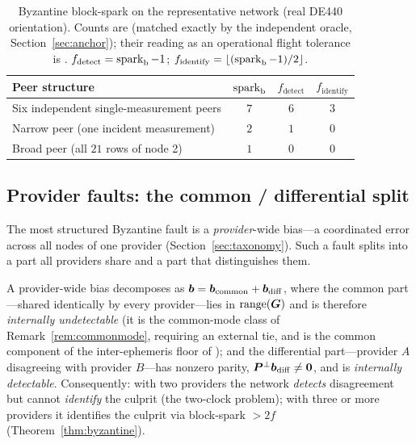 \begin{table}[t]
\centering
\caption{Byzantine block-spark on the representative network (real DE440 orientation).
Counts are \Validated{} (matched exactly by the independent oracle, Section~\ref{sec:anchor});
their reading as an operational flight tolerance is \Modelled{}. $f_{\mathrm{detect}}=
\operatorname{spark}_{\mathrm b}-1$; $f_{\mathrm{identify}}=\lfloor(\operatorname{spark}_{\mathrm b}-1)/2\rfloor$.}
\label{tab:byzantine}
\small
\setlength{\tabcolsep}{7pt}
\begin{tabular}{@{}lccc@{}}
\toprule
\textbf{Peer structure} & $\operatorname{spark}_{\mathrm b}$ & $f_{\mathrm{detect}}$ & $f_{\mathrm{identify}}$ \\
\midrule
Six independent single-measurement peers & $7$ & $6$ & $3$ \\
Narrow peer (one incident measurement)   & $2$ & $1$ & $0$ \\
Broad peer (all $21$ rows of node 2)     & $1$ & $0$ & $0$ \\
\bottomrule
\end{tabular}
\end{table}

\subsection{Provider faults: the common / differential split}
\label{sec:providersplit}

The most structured Byzantine fault is a \emph{provider}-wide bias---a coordinated error
across all nodes of one provider (Section~\ref{sec:taxonomy}). Such a fault splits into a
part all providers share and a part that distinguishes them.

\begin{proposition}
\label{prop:provider}
A provider-wide bias decomposes as $\bm{b}=\bm{b}_{\mathrm{common}}+\bm{b}_{\mathrm{diff}}$,
where the common part---shared identically by every provider---lies in $\operatorname{range}(\bm{G})$ and is
therefore \emph{internally undetectable} (it is the common-mode class of
Remark~\ref{rem:commonmode}, requiring an external tie, and is the common component of the
inter-ephemeris floor of \citep{baweja2026interop}); and the differential part---provider $A$
disagreeing with provider $B$---has nonzero parity, $\bm{P}^{\perp}\bm{b}_{\mathrm{diff}}\neq\bm0$,
and is \emph{internally detectable}. Consequently: with two providers the network
\emph{detects} disagreement but cannot \emph{identify} the culprit (the two-clock problem);
with three or more providers it identifies the culprit via block-spark $>2f$
(Theorem~\ref{thm:byzantine}).
\end{proposition}

